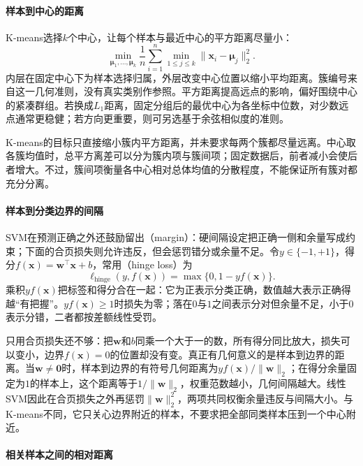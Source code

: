 \paragraph{样本到中心的距离}

K-means选择$k$个中心，让每个样本与最近中心的平方距离尽量小：
\begin{equation}
  \min_{\bm{\mu}_1,\ldots,\bm{\mu}_k}
  \frac{1}{n}\sum_{i=1}^{n}\min_{1\leq j\leq k}
  \lVert\bm{x}_i-\bm{\mu}_j\rVert_2^2.
  \label{eq:models-kmeans-objective}
\end{equation}
内层在固定中心下为样本选择归属，外层改变中心位置以缩小平均距离。簇编号来自这一几何准则，没有真实类别作参照。平方距离提高远点的影响，偏好围绕中心的紧凑群组。若换成$L_1$距离，固定分组后的最优中心为各坐标中位数，对少数远点通常更稳健；若方向更重要，则可另选基于余弦相似度的准则。

K-means的目标只直接缩小簇内平方距离，并未要求每两个簇都尽量远离。中心取各簇均值时，总平方离差可以分为簇内项与簇间项；固定数据后，前者减小会使后者增大。不过，簇间项衡量各中心相对总体均值的分散程度，不能保证所有簇对都充分分离。

\paragraph{样本到分类边界的间隔}

SVM在预测正确之外还鼓励留出（margin）：硬间隔设定把正确一侧和余量写成约束；下面的合页损失则允许违反，但会惩罚错分或余量不足。令$y\in\{-1,+1\}$，得分$f(\bm{x})=\bm{w}^{\top}\bm{x}+b$，常用（hinge loss）为
\begin{equation}
  \ell_{\mathrm{hinge}}(y,f(\bm{x}))
  =\max\{0,1-yf(\bm{x})\}.
  \label{eq:models-hinge}
\end{equation}
乘积$yf(\bm{x})$把标签和得分合在一起：它为正表示分类正确，数值越大表示正确得越“有把握”。$yf(\bm{x})\ge1$时损失为零；落在$0$与$1$之间表示分对但余量不足，小于$0$表示分错，二者都按差额线性受罚。

只用合页损失还不够：把$\bm{w}$和$b$同乘一个大于一的数，所有得分同比放大，损失可以变小，边界$f(\bm{x})=0$的位置却没有变。真正有几何意义的是样本到边界的距离。当$\bm{w}\ne\bm{0}$时，样本到边界的有符号几何距离为$yf(\bm{x})/\|\bm{w}\|_2$；在得分余量固定为$1$的样本上，这个距离等于$1/\|\bm{w}\|_2$，权重范数越小，几何间隔越大。线性SVM因此在合页损失之外再惩罚$\|\bm{w}\|_2^2$，两项共同权衡余量违反与间隔大小。与K-means不同，它只关心边界附近的样本，不要求把全部同类样本压到一个中心附近。

\paragraph{相关样本之间的相对距离}


